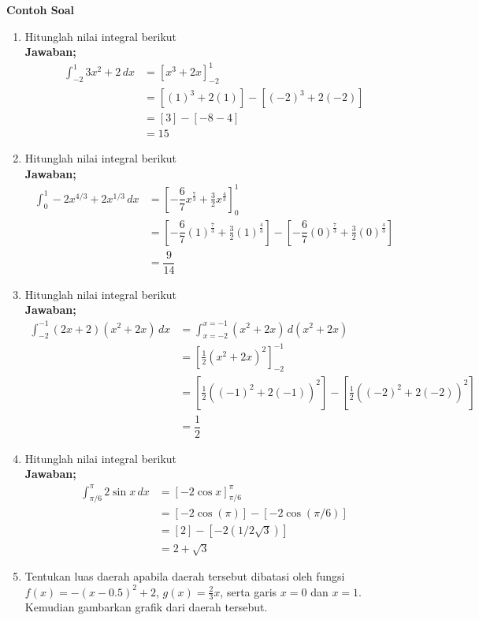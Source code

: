 \textbf{{Contoh Soal}}
\begin{enumerate}
	\item Hitunglah nilai integral berikut\\ %
	\textbf{Jawaban;}
	\begin{align*}
		\int_{-2}^{1}3x^2+2 \,dx &= \left[x^3+2x \right]_{-2}^{1} \\
		&= [(1)^3+2(1)]-[(-2)^3+2(-2)] \\
		&= [3]-[-8-4]\\
		&= 15
	\end{align*} 
	\item Hitunglah nilai integral berikut \\ %
	\textbf{Jawaban;}
	\begin{align*}
		\int_{0}^{1}-2x^{4/3} + 2x^{1/3} \,dx &= \left[-\dfrac{6}{7}x^{\frac{7}{3}}+\frac{3}{2}x^{\frac{4}{3}} \right]_{0}^{1} \\
		&= \left[-\dfrac{6}{7}(1)^{\frac{7}{3}}+\frac{3}{2}(1)^{\frac{4}{3}} \right]
		-\left[-\dfrac{6}{7}(0)^{\frac{7}{3}}+\frac{3}{2}(0)^{\frac{4}{3}} \right] \\
		&= \dfrac{9}{14}
	\end{align*} 
	\item Hitunglah nilai integral berikut\\ %
	\textbf{Jawaban;}
	\begin{align*}
		\int_{-2}^{-1}(2x+2)(x^2+2x) \,dx  &= \int_{x=-2}^{x=-1}(x^2+2x) \,d(x^2+2x) \\
		&= \left[ \frac{1}{2}(x^2+2x)^2 \right]_{-2}^{-1} \\
		&= \left[\frac{1}{2}((-1)^2+2(-1))^2\right]-\left[\frac{1}{2}((-2)^2+2(-2))^2\right] \\
		&= \dfrac{1}{2}
	\end{align*} 
	\item Hitunglah nilai integral berikut\\ %
	\textbf{Jawaban;}
	\begin{align*}
		\int_{\pi/6}^{\pi}2 \sin x \,dx  &= \left[-2 \cos x \right]_{\pi/6}^{\pi} \\
		&= [-2 \cos (\pi)]-[-2 \cos (\pi/6)] \\
		&= [2]-[-2(1/2\sqrt{3})]\\
		&= 2+\sqrt{3}
	\end{align*} 
	\item Tentukan luas daerah apabila daerah tersebut dibatasi oleh fungsi $ {\displaystyle f(x)=-(x-0.5)^2+2 }$, $ {\displaystyle g(x)=\frac{2}{3}x}$, serta garis $ x=0 $ dan $ x=1 $. Kemudian gambarkan grafik dari daerah tersebut.\\ %

\end{enumerate}
